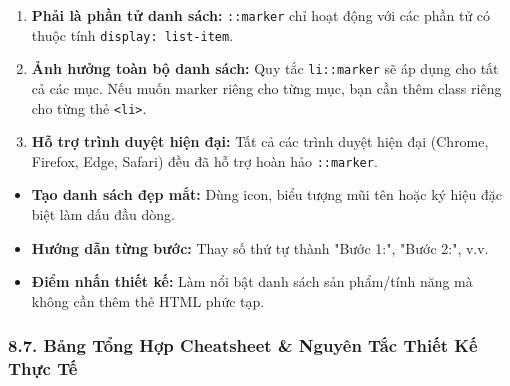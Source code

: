\documentclass[11pt,oneside]{book}
\newcommand{\codeinline}[1]{\textcolor{accentOrange}{\texttt{#1}}}
\begin{document}
\begin{warnBox}
\begin{enumerate}[leftmargin=1.5em, itemsep=3pt, parsep=0pt]
    \item \textbf{Phải là phần tử danh sách:} \codeinline{::marker} chỉ hoạt động với các phần tử có thuộc tính \codeinline{display: list-item}.
    \item \textbf{Ảnh hưởng toàn bộ danh sách:} Quy tắc \codeinline{li::marker} sẽ áp dụng cho tất cả các mục. Nếu muốn marker riêng cho từng mục, bạn cần thêm class riêng cho từng thẻ \codeinline{<li>}.
    \item \textbf{Hỗ trợ trình duyệt hiện đại:} Tất cả các trình duyệt hiện đại (Chrome, Firefox, Edge, Safari) đều đã hỗ trợ hoàn hảo \codeinline{::marker}.
\end{enumerate}
\end{warnBox}

\begin{conceptBox}
\begin{itemize}[leftmargin=1.5em, itemsep=2pt, parsep=0pt]
    \item \textbf{Tạo danh sách đẹp mắt:} Dùng icon, biểu tượng mũi tên hoặc ký hiệu đặc biệt làm dấu đầu dòng.
    \item \textbf{Hướng dẫn từng bước:} Thay số thứ tự thành "Bước 1:", "Bước 2:", v.v.
    \item \textbf{Điểm nhấn thiết kế:} Làm nổi bật danh sách sản phẩm/tính năng mà không cần thêm thẻ HTML phức tạp.
\end{itemize}
\end{conceptBox}

\subsubsection{8.7. Bảng Tổng Hợp Cheatsheet \& Nguyên Tắc Thiết Kế Thực Tế}
\end{document}
